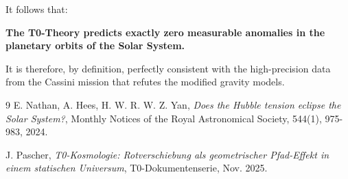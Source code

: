	It follows that:
	\begin{center}
		\textbf{The T0-Theory predicts exactly zero measurable anomalies in the planetary orbits of the Solar System.}
	\end{center}
	It is therefore, by definition, perfectly consistent with the high-precision data from the Cassini mission that refutes the modified gravity models.
	\begin{thebibliography}{9}
		E. Nathan, A. Hees, H. W. R. W. Z. Yan, \textit{Does the Hubble tension eclipse the Solar System?}, Monthly Notices of the Royal Astronomical Society, 544(1), 975-983, 2024.
		
		J. Pascher, \textit{T0-Kosmologie: Rotverschiebung als geometrischer Pfad-Effekt in einem statischen Universum}, T0-Dokumentenserie, Nov. 2025.
	\end{thebibliography}
	